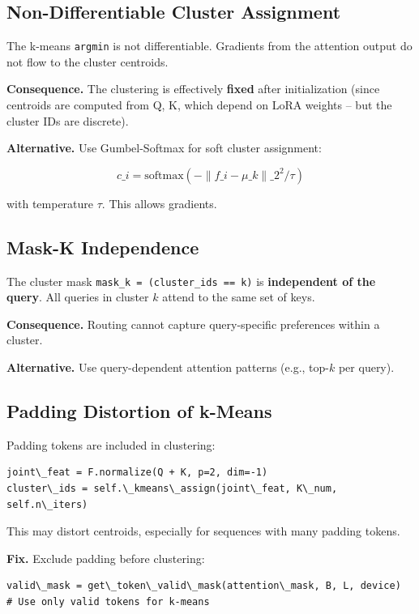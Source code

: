 \subsection{Non-Differentiable Cluster Assignment}

The k-means \texttt{argmin} is not differentiable. Gradients from the attention 
output do not flow to the cluster centroids.

\textbf{Consequence.} The clustering is effectively \textbf{fixed} after initialization 
(since centroids are computed from Q, K, which depend on LoRA weights -- 
but the cluster IDs are discrete).

\textbf{Alternative.} Use Gumbel-Softmax for soft cluster assignment:

\[
c\_i = \text{softmax}(-\|f\_i - \mu\_k\|\_2^2 / \tau)
\tag{8.1}
\]

with temperature $\tau$. This allows gradients.

\subsection{Mask-K Independence}

The cluster mask \texttt{mask\_k = (cluster\_ids == k)} is \textbf{independent of the query}. 
All queries in cluster $k$ attend to the same set of keys.

\textbf{Consequence.} Routing cannot capture query-specific preferences within a 
cluster.

\textbf{Alternative.} Use query-dependent attention patterns (e.g., top-$k$ per 
query).

\subsection{Padding Distortion of k-Means}

Padding tokens are included in clustering:

\begin{lstlisting}
joint\_feat = F.normalize(Q + K, p=2, dim=-1)
cluster\_ids = self.\_kmeans\_assign(joint\_feat, K\_num, self.n\_iters)
\end{lstlisting}

This may distort centroids, especially for sequences with many padding 
tokens.

\textbf{Fix.} Exclude padding before clustering:

\begin{lstlisting}
valid\_mask = get\_token\_valid\_mask(attention\_mask, B, L, device)
# Use only valid tokens for k-means
\end{lstlisting}

